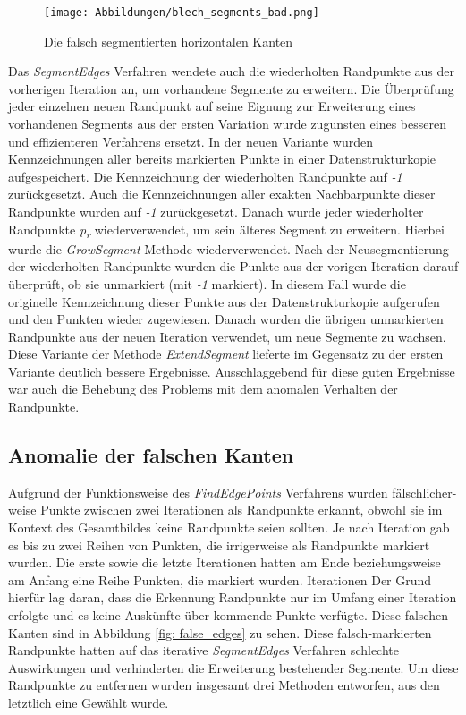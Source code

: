 \begin{figure}[h]
	\texttt{[image: Abbildungen/blech\_segments\_bad.png]}
	\centering
	\caption{Die falsch segmentierten horizontalen Kanten}
	\label{fig: bad_segments}
\end{figure}

Das \textit{SegmentEdges} Verfahren wendete auch die wiederholten Randpunkte aus der vorherigen Iteration an, um vorhandene Segmente zu erweitern. Die Überprüfung jeder einzelnen neuen Randpunkt auf seine Eignung zur Erweiterung eines vorhandenen Segments aus der ersten Variation wurde zugunsten eines besseren und effizienteren Verfahrens ersetzt. In der neuen Variante wurden Kennzeichnungen aller bereits markierten Punkte in einer Datenstrukturkopie aufgespeichert. Die Kennzeichnung der wiederholten Randpunkte auf \textit{-1} zurückgesetzt. Auch die Kennzeichnungen aller exakten Nachbarpunkte dieser Randpunkte wurden auf \textit{-1} zurückgesetzt. Danach wurde jeder wiederholter Randpunkte \textit{p\textsubscript{r}} wiederverwendet, um sein älteres Segment zu erweitern. Hierbei wurde die \textit{GrowSegment} Methode wiederverwendet. Nach der Neusegmentierung der wiederholten Randpunkte wurden die Punkte aus der vorigen Iteration darauf überprüft, ob sie unmarkiert (mit \textit{-1} markiert). In diesem Fall wurde die originelle Kennzeichnung dieser Punkte aus der Datenstrukturkopie aufgerufen und den Punkten wieder zugewiesen. Danach wurden die übrigen unmarkierten Randpunkte aus der neuen Iteration verwendet, um neue Segmente zu wachsen. Diese Variante der Methode \textit{ExtendSegment} lieferte im Gegensatz zu der ersten Variante deutlich bessere Ergebnisse. Ausschlaggebend für diese guten Ergebnisse war auch die Behebung des Problems mit dem anomalen Verhalten der Randpunkte.

\subsection{Anomalie der falschen Kanten} \label{false_edges}
Aufgrund der Funktionsweise des \textit{FindEdgePoints} Verfahrens wurden fälschlicher-weise Punkte zwischen zwei Iterationen als Randpunkte erkannt, obwohl sie im Kontext des Gesamtbildes keine Randpunkte seien sollten. Je nach Iteration gab es bis zu zwei Reihen von Punkten, die irrigerweise als Randpunkte markiert wurden. Die erste sowie die letzte Iterationen hatten am Ende beziehungsweise am Anfang eine Reihe Punkten, die markiert wurden. Iterationen  Der Grund hierfür lag daran, dass die Erkennung Randpunkte nur im Umfang einer Iteration erfolgte und es keine Auskünfte über kommende Punkte verfügte. Diese falschen Kanten sind in Abbildung \ref{fig: false_edges} zu sehen. Diese falsch-markierten Randpunkte hatten auf das iterative \textit{SegmentEdges} Verfahren schlechte Auswirkungen und verhinderten die Erweiterung bestehender Segmente. Um diese Randpunkte zu entfernen wurden insgesamt drei Methoden entworfen, aus den letztlich eine Gewählt wurde.

